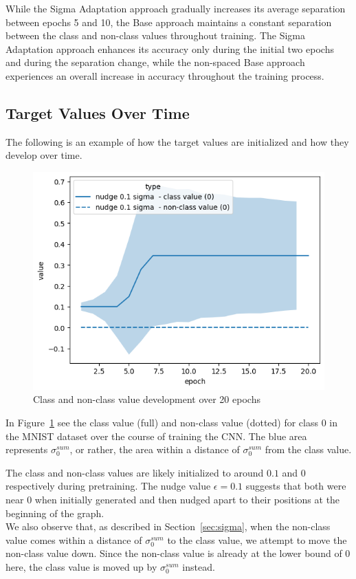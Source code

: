 \documentclass[12pt,fleqn,a4paper]{article}
\begin{document}
While the Sigma Adaptation approach gradually increases its average separation between epochs 5 and 10, the Base approach maintains a constant separation between the class and non-class values throughout training. The Sigma Adaptation approach enhances its accuracy only during the initial two epochs and during the separation change, while the non-spaced Base approach experiences an overall increase in accuracy throughout the training process.

\subsection{Target Values Over Time}
The following is an example of how the target values are initialized and how they develop over time.
\begin{figure}[H]
    \centering
    \includegraphics[width=0.5\linewidth]{graphs/sigma.png}
    \caption{Class and non-class value development over 20 epochs}
    \label{fig:class_dev}
\end{figure}

In Figure~\ref{fig:class_dev} see the class value (full) and non-class value (dotted) for class 0 in the MNIST dataset over the course of training the CNN. The blue area represents $\sigma^{sum}_0$, or rather, the area within a distance of $\sigma^{sum}_0$ from the class value. 

The class and non-class values are likely initialized to around $0.1$ and $0$ respectively during pretraining. The nudge value $\epsilon = 0.1$ suggests that both were near $0$ when initially generated and then nudged apart to their positions at the beginning of the graph.\\

We also observe that, as described in Section~\ref{sec:sigma}, when the non-class value comes within a distance of $\sigma^{sum}_0$ to the class value, we attempt to move the non-class value down. Since the non-class value is already at the lower bound of $0$ here, the class value is moved up by $\sigma^{sum}_0$ instead.
\end{document}
